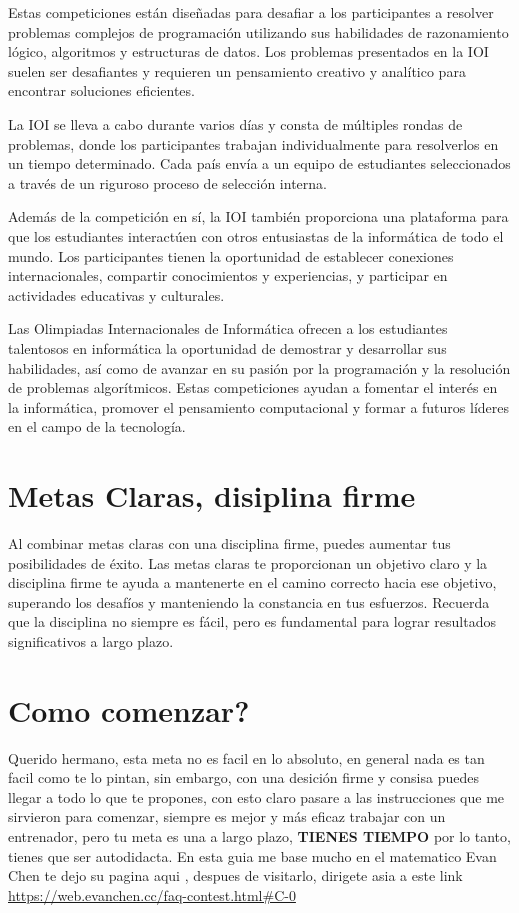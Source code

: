 \documentclass[11pt]{scrartcl}
\begin{document}
Estas competiciones están diseñadas para desafiar a los participantes a resolver problemas complejos de programación utilizando sus habilidades de razonamiento lógico, algoritmos y estructuras de datos. Los problemas presentados en la IOI suelen ser desafiantes y requieren un pensamiento creativo y analítico para encontrar soluciones eficientes.

La IOI se lleva a cabo durante varios días y consta de múltiples rondas de problemas, donde los participantes trabajan individualmente para resolverlos en un tiempo determinado. Cada país envía a un equipo de estudiantes seleccionados a través de un riguroso proceso de selección interna.

Además de la competición en sí, la IOI también proporciona una plataforma para que los estudiantes interactúen con otros entusiastas de la informática de todo el mundo. Los participantes tienen la oportunidad de establecer conexiones internacionales, compartir conocimientos y experiencias, y participar en actividades educativas y culturales.

Las Olimpiadas Internacionales de Informática ofrecen a los estudiantes talentosos en informática la oportunidad de demostrar y desarrollar sus habilidades, así como de avanzar en su pasión por la programación y la resolución de problemas algorítmicos. Estas competiciones ayudan a fomentar el interés en la informática, promover el pensamiento computacional y formar a futuros líderes en el campo de la tecnología.

\section{Metas Claras, disiplina firme}
Al combinar metas claras con una disciplina firme, puedes aumentar tus posibilidades de éxito. Las metas claras te proporcionan un objetivo claro y la disciplina firme te ayuda a mantenerte en el camino correcto hacia ese objetivo, superando los desafíos y manteniendo la constancia en tus esfuerzos. Recuerda que la disciplina no siempre es fácil, pero es fundamental para lograr resultados significativos a largo plazo.

\section{Como comenzar?}
Querido hermano, esta meta no es facil en lo absoluto, en general nada es tan facil como te lo pintan, sin embargo, con una desici\'on firme y consisa puedes llegar a todo lo que te propones, con esto claro pasare a las instrucciones que me sirvieron para comenzar, siempre es mejor y m\'as eficaz trabajar con un entrenador, pero tu meta es una a largo plazo, \textbf{TIENES TIEMPO} por lo tanto, tienes que ser autodidacta. En esta guia me base mucho en el matematico Evan Chen te dejo su pagina aqui \cite{evanchen}, despues de visitarlo, dirigete asia a este link \url{https://web.evanchen.cc/faq-contest.html#C-0}   
	
\end{document}
